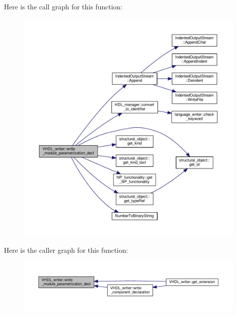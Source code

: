 Here is the call graph for this function\+:
\nopagebreak
\begin{figure}[H]
\begin{center}
\leavevmode
\includegraphics[width=350pt]{d0/d0c/structVHDL__writer_a0c54febb526f68c5d71314576086ec3b_cgraph}
\end{center}
\end{figure}
Here is the caller graph for this function\+:
\nopagebreak
\begin{figure}[H]
\begin{center}
\leavevmode
\includegraphics[width=350pt]{d0/d0c/structVHDL__writer_a0c54febb526f68c5d71314576086ec3b_icgraph}
\end{center}
\end{figure}
\mbox{\label{structVHDL__writer_a479a39c4d3b15e8052100fca87a45717}} 
